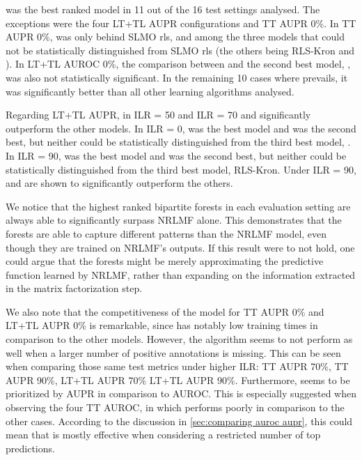  was the best ranked model in 11 out of the 16 test settings analysed. The exceptions were the four LT+TL AUPR configurations and TT AUPR 0\%. In TT AUPR 0\%,  was only behind SLMO rls, and among the three models that could not be statistically distinguished from SLMO rls (the others being RLS-Kron and ). In LT+TL AUROC 0\%, the comparison between  and the second best model, , was also not statistically significant. In the remaining 10 cases where  prevails, it was significantly better than all other learning algorithms analysed.

Regarding LT+TL AUPR, in ILR = 50 and ILR = 70  and  significantly outperform the other models. In ILR = 0,  was the best model and  was the second best, but neither could be statistically distinguished from the third best model, . In ILR = 90,  was the best model and  was the second best, but neither could be statistically distinguished from the third best model, RLS-Kron. Under ILR = 90,  and  are shown to significantly outperform the others.

We notice that the highest ranked bipartite forests in each evaluation setting are always able to significantly surpass NRLMF alone. This demonstrates that the forests are able to capture different patterns than the NRLMF model, even though they are trained on NRLMF's outputs. If this result were to not hold, one could argue that the forests might be merely approximating the predictive function learned by NRLMF, rather than expanding on the information extracted in the matrix factorization step.

We also note that the competitiveness of the  model for TT AUPR 0\% and LT+TL AUPR 0\% is remarkable, since  has notably low training times in comparison to the other models.  %
However, the algorithm seems to not perform as well when a larger number of positive annotations is missing. This can be seen when comparing those same test metrics under higher ILR: TT AUPR 70\%, TT AUPR 90\%, LT+TL AUPR 70\% LT+TL AUPR 90\%.
Furthermore,  seems to be prioritized by AUPR in comparison to AUROC. This is especially suggested when observing the four TT AUROC, in which  performs poorly in comparison to the other cases.
According to the discussion in \autoref{sec:comparing auroc aupr}, this could mean that  is mostly effective when considering a restricted number of top predictions.

